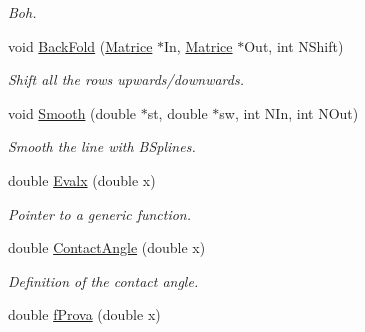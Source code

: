 \begin{DoxyCompactItemize}
\begin{DoxyCompactList}\small\item\em \-Boh. \end{DoxyCompactList}\item 
\hypertarget{classMatematica_abfaf13060e1740268d65e5a38a410cd6}{void \hyperlink{classMatematica_abfaf13060e1740268d65e5a38a410cd6}{\-Back\-Fold} (\hyperlink{classMatrice}{\-Matrice} $\ast$\-In, \hyperlink{classMatrice}{\-Matrice} $\ast$\-Out, int \-N\-Shift)}\label{classMatematica_abfaf13060e1740268d65e5a38a410cd6}

\begin{DoxyCompactList}\small\item\em \-Shift all the rows upwards/downwards. \end{DoxyCompactList}\item 
\hypertarget{classMatematica_a2cd25ce574ac8496d0228106f1acb7e6}{void \hyperlink{classMatematica_a2cd25ce574ac8496d0228106f1acb7e6}{\-Smooth} (double $\ast$st, double $\ast$sw, int \-N\-In, int \-N\-Out)}\label{classMatematica_a2cd25ce574ac8496d0228106f1acb7e6}

\begin{DoxyCompactList}\small\item\em \-Smooth the line with \-B\-Splines. \end{DoxyCompactList}\item 
\hypertarget{classMatematica_a628ac1d3c644d78362e0ec3aff1d2448}{double \hyperlink{classMatematica_a628ac1d3c644d78362e0ec3aff1d2448}{\-Evalx} (double x)}\label{classMatematica_a628ac1d3c644d78362e0ec3aff1d2448}

\begin{DoxyCompactList}\small\item\em \-Pointer to a generic function. \end{DoxyCompactList}\item 
\hypertarget{classMatematica_a2dd3ba2334c4444c4ef406347618c170}{double \hyperlink{classMatematica_a2dd3ba2334c4444c4ef406347618c170}{\-Contact\-Angle} (double x)}\label{classMatematica_a2dd3ba2334c4444c4ef406347618c170}

\begin{DoxyCompactList}\small\item\em \-Definition of the contact angle. \end{DoxyCompactList}\item 
\hypertarget{classMatematica_a4f67dd8ca48e4eccf15e32c736db6621}{double \hyperlink{classMatematica_a4f67dd8ca48e4eccf15e32c736db6621}{f\-Prova} (double x)}\label{classMatematica_a4f67dd8ca48e4eccf15e32c736db6621}


\end{DoxyCompactItemize}
